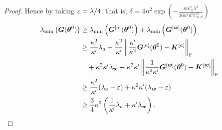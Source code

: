 \documentclass{article}
\begin{document}
\begin{proof}
    Hence by taking $\varepsilon=\lambda/4$, that is, $\delta=4n^2\exp\left(-\frac{mC_0\lambda^2}{16n^2d^2C_{\psi,d}^2}\right)$
    \begin{equation}
        \begin{aligned}
            \lambda_{\min}\left(\bm{G}(\bm{\theta}^0)\right)
             & \geq\lambda_{\min}\left(\bm{G}^{[a]}(\bm{\theta}^0)\right) + \lambda_{\min}\left(\bm{G}^{[\bm{w}]}(\bm{\theta}^0)\right)                                   \\
             & \geq\frac{\kappa^2}{\kappa'}\lambda_a-\frac{\kappa^2}{\kappa'} \left\lVert\frac{\kappa'}{\kappa^2}\bm{G}^{[a]}(\bm{\theta}^0) - \bm{K}^{[a]}\right\rVert_\mathrm{F} \\
             & \quad + \kappa^2\kappa'\lambda_{\bm{w}} - \kappa^2\kappa'\left\lVert\frac{1}{\kappa^2\kappa'}\bm{G}^{[\bm{w}]}(\bm{\theta}^0) - \bm{K}^{[\bm{w}]}\right\rVert_\mathrm{F}     \\
             & \geq\frac{\kappa^2}{\kappa'}(\lambda_a-\varepsilon)+\kappa^2\kappa'(\lambda_{\bm{w}}-\varepsilon)                                                          \\
             & \geq\frac{3}{4}\kappa^2\left(\frac{1}{\kappa'}\lambda_a+\kappa'\lambda_{\bm{w}}\right).
        \end{aligned}
    \end{equation}
\end{proof}
\end{document}
